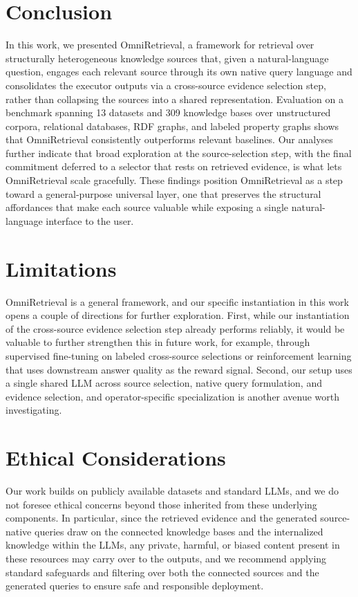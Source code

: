 \section{Conclusion}

In this work, we presented OmniRetrieval, a framework for retrieval over structurally heterogeneous knowledge sources that, given a natural-language question, engages each relevant source through its own native query language and consolidates the executor outputs via a cross-source evidence selection step, rather than collapsing the sources into a shared representation. Evaluation on a benchmark spanning 13 datasets and 309 knowledge bases over unstructured corpora, relational databases, RDF graphs, and labeled property graphs shows that OmniRetrieval consistently outperforms relevant baselines. Our analyses further indicate that broad exploration at the source-selection step, with the final commitment deferred to a selector that rests on retrieved evidence, is what lets OmniRetrieval scale gracefully. These findings position OmniRetrieval as a step toward a general-purpose universal layer, one that preserves the structural affordances that make each source valuable while exposing a single natural-language interface to the user.

\section*{Limitations}

OmniRetrieval is a general framework, and our specific instantiation in this work opens a couple of directions for further exploration. First, while our instantiation of the cross-source evidence selection step already performs reliably, it would be valuable to further strengthen this in future work, for example, through supervised fine-tuning on labeled cross-source selections or reinforcement learning that uses downstream answer quality as the reward signal. Second, our setup uses a single shared LLM across source selection, native query formulation, and evidence selection, and operator-specific specialization is another avenue worth investigating.

\section*{Ethical Considerations}

Our work builds on publicly available datasets and standard LLMs, and we do not foresee ethical concerns beyond those inherited from these underlying components. In particular, since the retrieved evidence and the generated source-native queries draw on the connected knowledge bases and the internalized knowledge within the LLMs, any private, harmful, or biased content present in these resources may carry over to the outputs, and we recommend applying standard safeguards and filtering over both the connected sources and the generated queries to ensure safe and responsible deployment.
